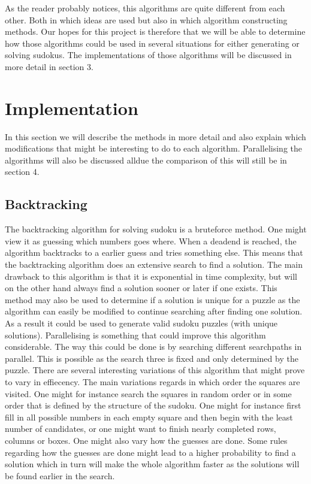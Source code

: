 \documentclass[a4paper,11pt]{kth-mag}
\begin{document}
As the reader probably notices, this algorithms are quite different from each other.
Both in which ideas are used but also in which algorithm constructing methods.
Our hopes for this project is therefore that we will be able to determine how those algorithms could be used in several situations for either generating or solving sudokus.
The implementations of those algorithms will be discussed in more detail in section 3. 

\section{Implementation}

In this section we will describe the methods in more detail and also explain which modifications that might be interesting to do to each algorithm.
Parallelising the algorithms will also be discussed alldue the comparison of this will still be in section 4.

\subsection{Backtracking}

The backtracking algorithm for solving sudoku is a bruteforce method.
One might view it as guessing which numbers goes where.
When a deadend is reached, the algorithm backtracks to a earlier guess and tries something else.
This means that the backtracking algorithm does an extensive search to find a solution.
The main drawback to this algorithm is that it is exponential in time complexity, but will on the other hand always find a solution sooner or later if one exists.
This method may also be used to determine if a solution is unique for a puzzle as the algorithm can easily be modified to continue searching after finding one solution.
As a result it could be used to generate valid sudoku puzzles (with unique solutions).
\newline
Parallelising is something that could improve this algorithm considerable.
The way this could be done is by searching different searchpaths in parallel. This is possible as the search three is fixed and only determined by the puzzle.
\newline
There are several interesting variations of this algorithm that might prove to vary in effiecency.
The main variations regards in which order the squares are visited.
One might for instance search the squares in random order or in some order that is defined by the structure of the sudoku.
One might for instance first fill in all possible numbers in each empty square and then begin with the least number of candidates, or one might want to finish nearly completed rows, columns or boxes.
One might also vary how the guesses are done.
Some rules regarding how the guesses are done might lead to a higher probability to find a solution which in turn will make the whole algorithm faster as the solutions will be found earlier in the search.
\end{document}
